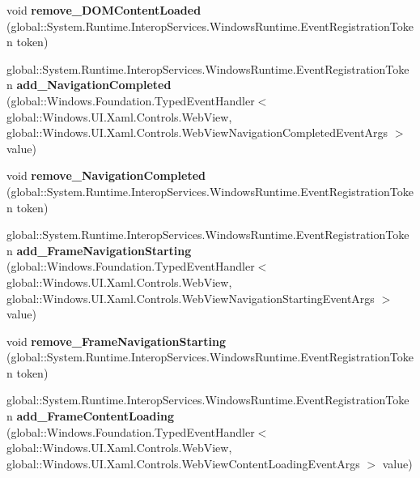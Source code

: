 \begin{DoxyCompactItemize}
void {\bfseries remove\+\_\+\+D\+O\+M\+Content\+Loaded} (global\+::\+System.\+Runtime.\+Interop\+Services.\+Windows\+Runtime.\+Event\+Registration\+Token token)
\item 
\mbox{\label{interface_windows_1_1_u_i_1_1_xaml_1_1_controls_1_1_i_web_view2_ac4ba94ee4e34e6437000d0e1f34a76cf}} 
global\+::\+System.\+Runtime.\+Interop\+Services.\+Windows\+Runtime.\+Event\+Registration\+Token {\bfseries add\+\_\+\+Navigation\+Completed} (global\+::\+Windows.\+Foundation.\+Typed\+Event\+Handler$<$ global\+::\+Windows.\+U\+I.\+Xaml.\+Controls.\+Web\+View, global\+::\+Windows.\+U\+I.\+Xaml.\+Controls.\+Web\+View\+Navigation\+Completed\+Event\+Args $>$ value)
\item 
\mbox{\label{interface_windows_1_1_u_i_1_1_xaml_1_1_controls_1_1_i_web_view2_a7c6af1243cf0100a4028f3aaaf48f8b2}} 
void {\bfseries remove\+\_\+\+Navigation\+Completed} (global\+::\+System.\+Runtime.\+Interop\+Services.\+Windows\+Runtime.\+Event\+Registration\+Token token)
\item 
\mbox{\label{interface_windows_1_1_u_i_1_1_xaml_1_1_controls_1_1_i_web_view2_ad33eb6ddf290983e9f6e350de4ac2d33}} 
global\+::\+System.\+Runtime.\+Interop\+Services.\+Windows\+Runtime.\+Event\+Registration\+Token {\bfseries add\+\_\+\+Frame\+Navigation\+Starting} (global\+::\+Windows.\+Foundation.\+Typed\+Event\+Handler$<$ global\+::\+Windows.\+U\+I.\+Xaml.\+Controls.\+Web\+View, global\+::\+Windows.\+U\+I.\+Xaml.\+Controls.\+Web\+View\+Navigation\+Starting\+Event\+Args $>$ value)
\item 
\mbox{\label{interface_windows_1_1_u_i_1_1_xaml_1_1_controls_1_1_i_web_view2_a93262ec1ba7af52f7ad156f65df18af8}} 
void {\bfseries remove\+\_\+\+Frame\+Navigation\+Starting} (global\+::\+System.\+Runtime.\+Interop\+Services.\+Windows\+Runtime.\+Event\+Registration\+Token token)
\item 
\mbox{\label{interface_windows_1_1_u_i_1_1_xaml_1_1_controls_1_1_i_web_view2_a131ab872c36d8541d45eadfe0d090bc5}} 
global\+::\+System.\+Runtime.\+Interop\+Services.\+Windows\+Runtime.\+Event\+Registration\+Token {\bfseries add\+\_\+\+Frame\+Content\+Loading} (global\+::\+Windows.\+Foundation.\+Typed\+Event\+Handler$<$ global\+::\+Windows.\+U\+I.\+Xaml.\+Controls.\+Web\+View, global\+::\+Windows.\+U\+I.\+Xaml.\+Controls.\+Web\+View\+Content\+Loading\+Event\+Args $>$ value)

\end{DoxyCompactItemize}
